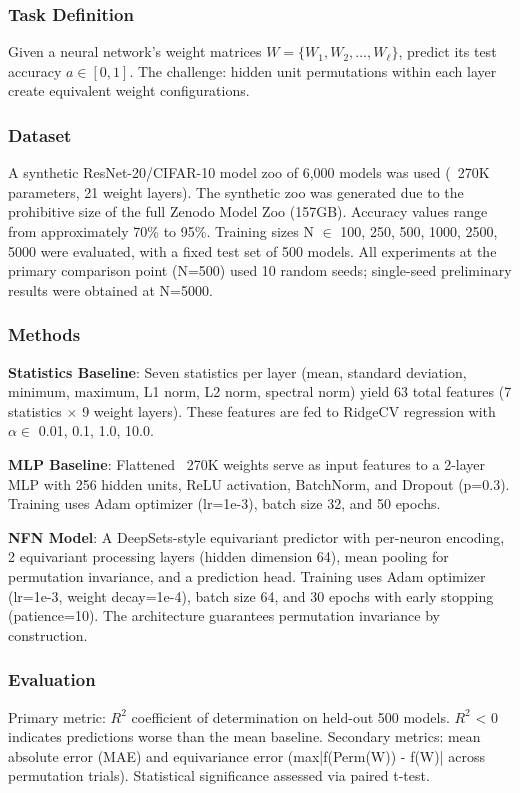 
\subsubsection{Task Definition}

Given a neural network's weight matrices $W = \{W_1, W_2, \ldots, W_\ell\}$, predict its test accuracy $a \in [0, 1]$. The challenge: hidden unit permutations within each layer create equivalent weight configurations.

\subsubsection{Dataset}

A synthetic ResNet-20/CIFAR-10 model zoo of 6,000 models was used (~270K parameters, 21 weight layers). The synthetic zoo was generated due to the prohibitive size of the full Zenodo Model Zoo (157GB). Accuracy values range from approximately 70\% to 95\%. Training sizes N $\in$ {100, 250, 500, 1000, 2500, 5000} were evaluated, with a fixed test set of 500 models. All experiments at the primary comparison point (N=500) used 10 random seeds; single-seed preliminary results were obtained at N=5000.

\subsubsection{Methods}

\textbf{Statistics Baseline}: Seven statistics per layer (mean, standard deviation, minimum, maximum, L1 norm, L2 norm, spectral norm) yield 63 total features (7 statistics $\times$ 9 weight layers). These features are fed to RidgeCV regression with $\alpha \in$ {0.01, 0.1, 1.0, 10.0}.

\textbf{MLP Baseline}: Flattened ~270K weights serve as input features to a 2-layer MLP with 256 hidden units, ReLU activation, BatchNorm, and Dropout (p=0.3). Training uses Adam optimizer (lr=1e-3), batch size 32, and 50 epochs.

\textbf{NFN Model}: A DeepSets-style equivariant predictor with per-neuron encoding, 2 equivariant processing layers (hidden dimension 64), mean pooling for permutation invariance, and a prediction head. Training uses Adam optimizer (lr=1e-3, weight decay=1e-4), batch size 64, and 30 epochs with early stopping (patience=10). The architecture guarantees permutation invariance by construction.

\subsubsection{Evaluation}

Primary metric: $R^2$ coefficient of determination on held-out 500 models. $R^2$ < 0 indicates predictions worse than the mean baseline. Secondary metrics: mean absolute error (MAE) and equivariance error (max|f(Perm(W)) - f(W)| across permutation trials). Statistical significance assessed via paired t-test.
